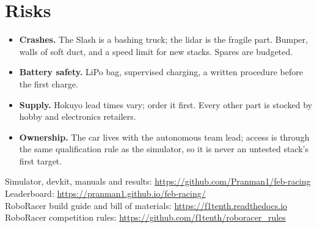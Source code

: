 \documentclass[11pt,a4paper]{article}
\begin{document}
\section{Risks}

\begin{itemize}
  \item \textbf{Crashes.} The Slash is a bashing truck; the lidar is the fragile part. Bumper, walls of soft duct, and a speed limit for new stacks. Spares are budgeted.
  \item \textbf{Battery safety.} LiPo bag, supervised charging, a written procedure before the first charge.
  \item \textbf{Supply.} Hokuyo lead times vary; order it first. Every other part is stocked by hobby and electronics retailers.
  \item \textbf{Ownership.} The car lives with the autonomous team lead; access is through the same qualification rule as the simulator, so it is never an untested stack's first target.
\end{itemize}

\bigskip
\noindent Simulator, devkit, manuals and results: \url{https://github.com/Pranman1/feb-racing}\\
Leaderboard: \url{https://pranman1.github.io/feb-racing/}\\
RoboRacer build guide and bill of materials: \url{https://f1tenth.readthedocs.io}\\
RoboRacer competition rules: \url{https://github.com/f1tenth/roboracer_rules}
\end{document}
